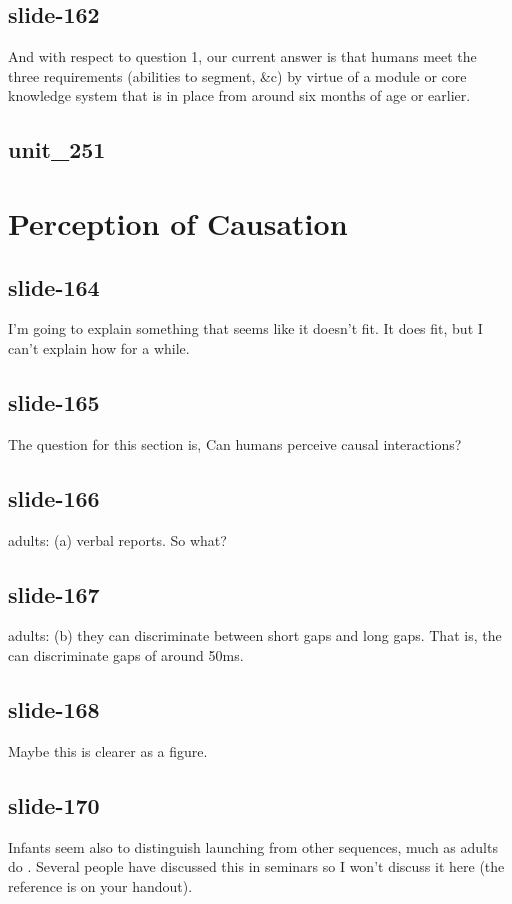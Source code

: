 \documentclass[12pt,\papersize]{extarticle}
\begin{document}
 
\subsection{slide-162}
And with respect to question 1, our current answer is that humans meet the three requirements (abilities to segment, \&c) by virtue of a module or core knowledge system that is in place from around six months of age or earlier.
 
 
\subsection{unit\_251}
 
\section{Perception of Causation}
 
 
\subsection{slide-164}
I'm going to explain something that seems like it doesn't fit.
It does fit, but I can't explain how for a while.
 
 
\subsection{slide-165}
The question for this section is,
Can humans perceive causal interactions?
 
 
\subsection{slide-166}
adults: (a) verbal reports. So what?
 
 
\subsection{slide-167}
adults: (b) they can discriminate between short gaps and long gaps.
That is, the can discriminate gaps of around 50ms.
 
 
\subsection{slide-168}
Maybe this is clearer as a figure.
 
 
\subsection{slide-170}
Infants seem also to distinguish launching from other sequences, much as adults do \citep{Leslie:1987nr}.
Several people have discussed this in seminars so I won't discuss it here (the reference is on your handout).
 
\end{document}
